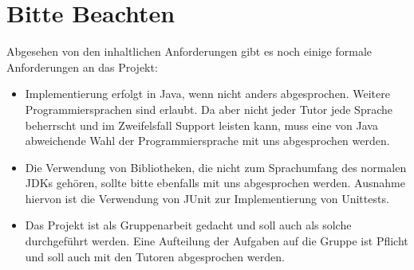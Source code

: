 \documentclass{programmierpraktikum}
\begin{document}
\section{Bitte Beachten}
Abgesehen von den inhaltlichen Anforderungen gibt es noch einige formale Anforderungen an das
Projekt:
\begin{itemize}
  \item Implementierung erfolgt in Java, wenn nicht anders abgesprochen. Weitere Programmiersprachen sind erlaubt. Da aber nicht jeder Tutor jede Sprache beherrscht und im Zweifelsfall Support leisten kann, muss eine von Java abweichende Wahl der Programmiersprache mit uns abgesprochen werden.
  \item Die Verwendung von Bibliotheken, die nicht zum Sprachumfang des normalen JDKs gehören, sollte bitte ebenfalls mit uns abgesprochen werden. Ausnahme hiervon ist die Verwendung von JUnit zur Implementierung von Unittests.
  \item Das Projekt ist als Gruppenarbeit gedacht und soll auch als solche durchgeführt werden. Eine Aufteilung der Aufgaben auf die Gruppe ist Pflicht und soll auch mit den Tutoren abgesprochen werden.
\end{itemize}
\end{document}
